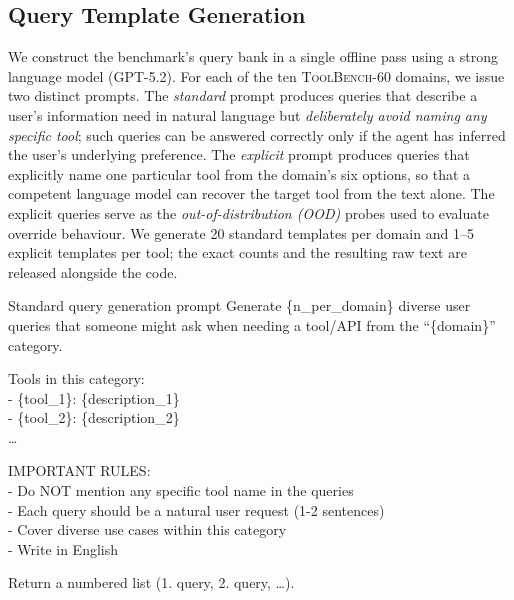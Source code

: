 \subsection{Query Template Generation}
\label{app:prompts:generation}

We construct the benchmark's query bank in a single offline pass using a
strong language model (\textsc{GPT-5.2}). For each of the ten
\textsc{ToolBench-60} domains, we issue two distinct prompts. The
\emph{standard} prompt produces queries that describe a user's
information need in natural language but \emph{deliberately avoid
naming any specific tool}; such queries can be answered correctly only
if the agent has inferred the user's underlying preference. The
\emph{explicit} prompt produces queries that explicitly name one
particular tool from the domain's six options, so that a competent
language model can recover the target tool from the text alone. The
explicit queries serve as the \emph{out-of-distribution (OOD)} probes
used to evaluate override behaviour. We generate 20 standard templates
per domain and 1--5 explicit templates per tool; the exact counts and
the resulting raw text are released alongside the code.

\begin{promptbox}{Standard query generation prompt}
Generate \{n\_per\_domain\} diverse user queries that someone might ask
when needing a tool/API from the ``\{domain\}'' category.

Tools in this category:\\
\hspace*{1em}- \{tool\_1\}: \{description\_1\}\\
\hspace*{1em}- \{tool\_2\}: \{description\_2\}\\
\hspace*{1em}\ldots

IMPORTANT RULES:\\
\hspace*{1em}- Do NOT mention any specific tool name in the queries\\
\hspace*{1em}- Each query should be a natural user request (1-2 sentences)\\
\hspace*{1em}- Cover diverse use cases within this category\\
\hspace*{1em}- Write in English

Return a numbered list (1. query, 2. query, \ldots).
\end{promptbox}

